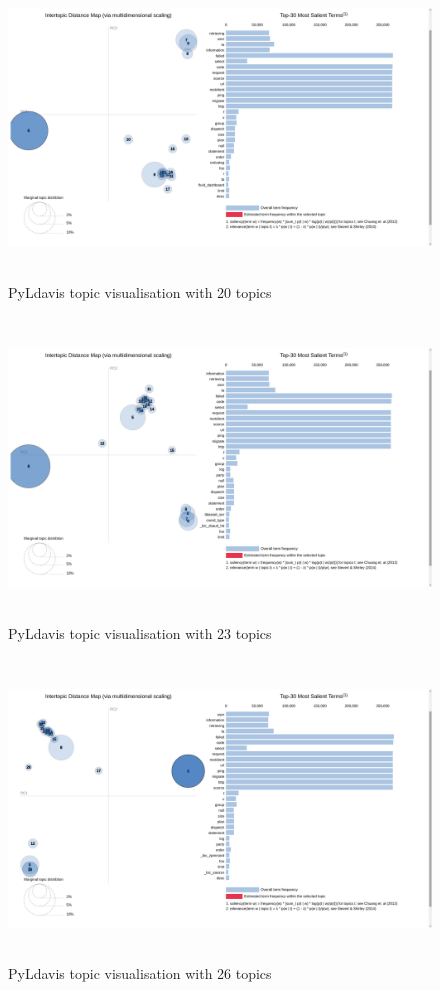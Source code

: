  \begin{figure}[!h]
    \centering
    \includegraphics[width=15cm, height=8cm,trim=0 0 100px 0, clip=true]{figures/pyldavis/pyldavis_20.png}
    \caption{PyLdavis topic visualisation with 20 topics}
    \label{fig:pyldavis_20}
\end{figure}

 \begin{figure}[!h]
    \centering
    \includegraphics[width=15cm, height=8cm,trim=0 0 100px 0, clip=true]{figures/pyldavis/pyldavis_23.png}
    \caption{PyLdavis topic visualisation with 23 topics}
    \label{fig:pyldavis_23}
\end{figure}

 \begin{figure}[!h]
    \centering
    \includegraphics[width=15cm, height=8cm,trim=0 0 100px 0, clip=true]{figures/pyldavis/pyldavis_26.png}
    \caption{PyLdavis topic visualisation with 26 topics}
    \label{fig:pyldavis_26}
\end{figure}

